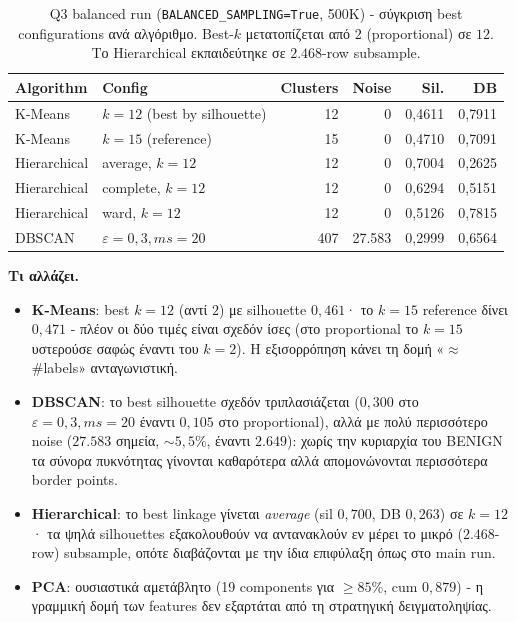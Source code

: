 \documentclass[12pt,a4paper,twoside]{book}
\begin{document}
\begin{table}[H]
    \centering
    \small
    \begin{tabular}{llrrrr}
        \toprule
        \textbf{Algorithm} & \textbf{Config} & \textbf{Clusters} &
        \textbf{Noise} & \textbf{Sil.} & \textbf{DB} \\
        \midrule
        K-Means      & \(k=12\) (best by silhouette)     & 12  & 0      & 0{,}4611 & 0{,}7911 \\
        K-Means      & \(k=15\) (reference)              & 15  & 0      & 0{,}4710 & 0{,}7091 \\
        Hierarchical & average, \(k=12\)                 & 12  & 0      & 0{,}7004 & 0{,}2625 \\
        Hierarchical & complete, \(k=12\)                & 12  & 0      & 0{,}6294 & 0{,}5151 \\
        Hierarchical & ward, \(k=12\)                    & 12  & 0      & 0{,}5126 & 0{,}7815 \\
        DBSCAN       & \(\varepsilon=0{,}3, ms=20\)      & 407 & 27.583 & 0{,}2999 & 0{,}6564 \\
        \bottomrule
    \end{tabular}
    \caption{Q3 balanced run (\texttt{BALANCED\_SAMPLING=True}, 500K) -
    σύγκριση best configurations ανά αλγόριθμο. Best-\(k\) μετατοπίζεται από
    \(2\) (proportional) σε \(12\). Το Hierarchical εκπαιδεύτηκε σε
    \(2.468\)-row subsample.}\label{tab:q3_comparison_balanced}
\end{table}

\textbf{Τι αλλάζει.}
\begin{itemize}
    \item \textbf{K-Means}: best \(k=12\) (αντί \(2\)) με silhouette
    \(0{,}461\)· το \(k=15\) reference δίνει \(0{,}471\) - πλέον οι δύο τιμές
    είναι σχεδόν ίσες (στο proportional το \(k=15\) υστερούσε σαφώς έναντι του
    \(k=2\)). Η εξισορρόπηση κάνει τη δομή «\(\approx\) \#labels» ανταγωνιστική.
    \item \textbf{DBSCAN}: το best silhouette σχεδόν τριπλασιάζεται
    (\(0{,}300\) στο \(\varepsilon=0{,}3, ms=20\) έναντι \(0{,}105\) στο
    proportional), αλλά με πολύ περισσότερο noise (\(27.583\) σημεία,
    \(\sim 5{,}5\%\), έναντι \(2.649\)): χωρίς την κυριαρχία του BENIGN τα
    σύνορα πυκνότητας γίνονται καθαρότερα αλλά απομονώνονται περισσότερα
    border points.
    \item \textbf{Hierarchical}: το best linkage γίνεται \emph{average}
    (sil \(0{,}700\), DB \(0{,}263\)) σε \(k=12\)· τα ψηλά silhouettes
    εξακολουθούν να αντανακλούν εν μέρει το μικρό (\(2.468\)-row)
    subsample, οπότε διαβάζονται με την ίδια επιφύλαξη όπως στο main run.
    \item \textbf{PCA}: ουσιαστικά αμετάβλητο (19 components για \(\geq 85\%\),
    cum \(0{,}879\)) - η γραμμική δομή των features δεν εξαρτάται από τη
    στρατηγική δειγματοληψίας.
\end{itemize}
\end{document}

